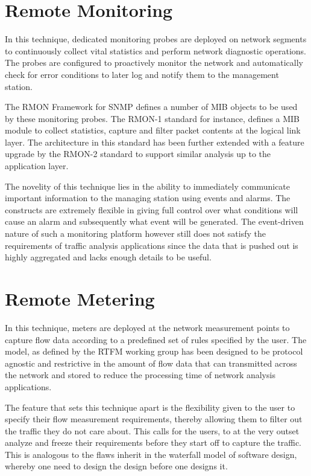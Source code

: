 \section{Remote Monitoring}\label{sec:remote-monitoring}
In this technique, dedicated monitoring probes are deployed on network segments to continuously collect vital statistics and perform network diagnostic operations. The probes are configured to proactively monitor the network and automatically check for error conditions to later log and notify them to the management station. 

The \ac{RMON} Framework \cite{rfc3577} for \ac{SNMP} \cite{rfc1157} defines a number of \ac{MIB} objects to be used by these monitoring probes. The \ac{RMON}-1 standard \cite{rfc2819} for instance, defines a \ac{MIB}  module to collect statistics, capture and filter packet contents at the logical link layer. The architecture in this standard has been further extended with a feature upgrade by the \ac{RMON}-2 standard \cite{rfc4502} to support similar analysis up to the application layer.

The novelity of this technique lies in the ability to immediately communicate important information to the managing station using events and alarms. The constructs are extremely flexible in giving full control over what conditions will cause an alarm  and subsequently what event will be generated. The event-driven nature of such a monitoring platform however still does not satisfy the requirements of traffic analysis applications since the data that is pushed out is highly aggregated and lacks enough details to be useful. 

\section{Remote Metering}\label{sec:remote-metering}
In this technique, meters are deployed at the network measurement points to capture flow data according to a predefined set of rules specified by the user. The model, as defined by the \ac{RTFM} working group \cite{rfc2722} has been designed to be protocol agnostic and restrictive in the amount of flow data that can transmitted across the network and stored to reduce the processing time of network analysis applications. 

The feature that sets this technique apart is the flexibility given to the user to specify their flow measurement requirements, thereby allowing them to filter out the traffic they do not care about. This calls for the users, to at the very outset analyze  and freeze their requirements before they start off to capture the traffic. This is analogous to the flaws inherit in the waterfall model \cite{wroyce:1987} of software design, whereby one need to design the design before one designs it.